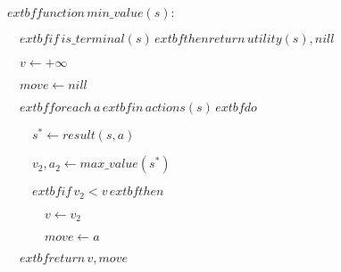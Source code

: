 \documentclass[preview]{standalone}
\begin{document}
\begin{center}
$	extbf{function} \, min\_value(s):$

$\quad 	extbf{if} \, is\_terminal(s) \, 	extbf{then return} \, utility(s), nill$

$\quad v \leftarrow +\infty$

$\quad move \leftarrow nill$

$\quad 	extbf{for each} \, a \, 	extbf{in} \, actions(s) \, 	extbf{do}$

$\qquad s^* \leftarrow result(s, a)$

$\qquad v_2, a_2 \leftarrow max\_value(s^*)$

$\qquad 	extbf{if} \, v_2 < v \, 	extbf{then}$

$\qquad \quad v \leftarrow v_2$

$\qquad \quad move \leftarrow a$

$\quad 	extbf{return} \, v, move$
\end{center}
\end{document}
